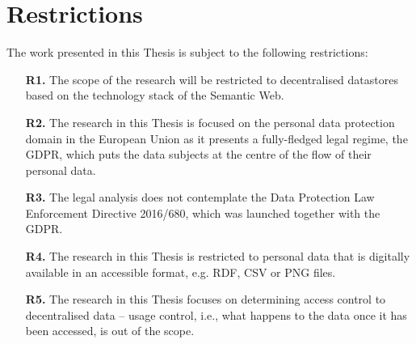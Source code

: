 \section{Restrictions}
\label{sec:restrictions}

The work presented in this Thesis is subject to the following restrictions:

\begin{enumerate}
    \item [\textbf{R1.}] The scope of the research will be restricted to decentralised datastores based on the technology stack of the Semantic Web.
    \item [\textbf{R2.}] The research in this Thesis is focused on the personal data protection domain in the European Union as it presents a fully-fledged legal regime, the GDPR, which puts the data subjects at the centre of the flow of their personal data.
    \item [\textbf{R3.}] The legal analysis does not contemplate the Data Protection Law Enforcement Directive 2016/680, which was launched together with the GDPR.
    \item [\textbf{R4.}] The research in this Thesis is restricted to personal data that is digitally available in an accessible format, e.g. RDF, CSV or PNG files.
    \item [\textbf{R5.}] The research in this Thesis focuses on determining access control to decentralised data -- usage control, i.e., what happens to the data once it has been accessed, is out of the scope.
\end{enumerate}